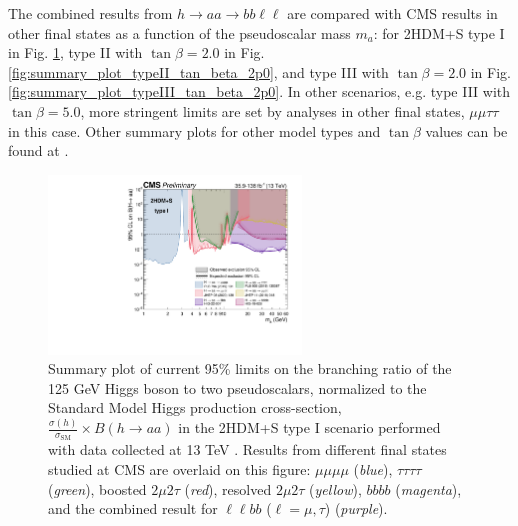 The combined results from $h\rightarrow aa \rightarrow bb\ell\ell$ are compared with CMS results in other final states as a function of the pseudoscalar mass $m_a$: for 2HDM+S type I in Fig. \ref{fig:summary_plot_type_I}, type II with $\tan\beta = 2.0$ in Fig. \ref{fig:summary_plot_typeII_tan_beta_2p0}, and type III with $\tan\beta = 2.0$ in Fig. \ref{fig:summary_plot_typeIII_tan_beta_2p0}. In other scenarios, e.g. type III with $\tan\beta = 5.0$, more stringent limits are set by analyses in other final states, $\mu\mu\tau\tau$ in this case. Other summary plots for other model types and $\tan\beta$ values can be found at \cite{twiki_2HDM+S_summary-plots}.


\begin{figure}[h]
    \begin{center}
      \includegraphics[width=0.6\textwidth]{figures/ch-10-results/summary_plot_full_run2_plot_BRaa_Type1.pdf}
    \end{center}
    \caption[Summary plot of current observed and expected 95\% CL limits on the branching ratio of the 125 GeV Higgs boson to two pseudoscalars, normalized to the Standard Model Higgs production cross-section, $\frac{\sigma(h)}{\sigma_{\text{SM}}} \times B(h \rightarrow aa)$, in the 2HDM+S type I scenario, obtained at CMS with data collected at 13 TeV.]{Summary plot of current 95\% limits on the branching ratio of the 125 GeV Higgs boson to two pseudoscalars, normalized to the Standard Model Higgs production cross-section, $\frac{\sigma(h)}{\sigma_{\text{SM}}} \times B(h \rightarrow aa)$ in the 2HDM+S type I scenario performed with data collected at 13 TeV \cite{twiki_2HDM+S_summary-plots}. Results from different final states studied at CMS are overlaid on this figure: $\mu\mu\mu\mu$ (\textit{blue}), $\tau\tau\tau\tau$ (\textit{green}), boosted $2\mu 2\tau$ (\textit{red}), resolved $2\mu 2\tau$ (\textit{yellow}), $bbbb$ (\textit{magenta}), and the combined result for $\ell\ell bb$ ($\ell = \mu, \tau$) (\textit{purple}).}
      \label{fig:summary_plot_type_I}
  \end{figure}
